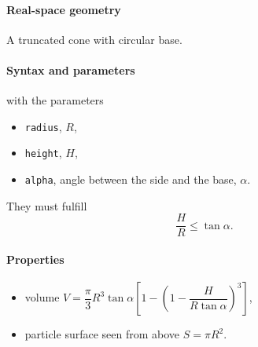 \paragraph{Real-space geometry}
A truncated cone with circular base.

\begin{figure}[h]
\hfill
{}
\hfill
{}
\hfill
\end{figure}

\paragraph{Syntax and parameters}
\begin{quote}
\end{quote}
with the parameters
\begin{itemize}
\item \texttt{radius}, $R$,
\item \texttt{height}, $H$,
\item \texttt{alpha}, angle between the side and the base, $\alpha$.
\end{itemize}
They must fulfill
\begin{displaymath}
  \dfrac{H}{R}\le \tan\alpha.
\end{displaymath}

\paragraph{Properties}
\begin{itemize}
\item volume $V = \dfrac{\pi}{3} R^3\tan\alpha  \left[ 
            1 - \left(1- \dfrac{H}{R\tan\alpha}\right)^3\right]$,
\item  particle surface seen from above $S=\pi R^2$.
\end{itemize}

